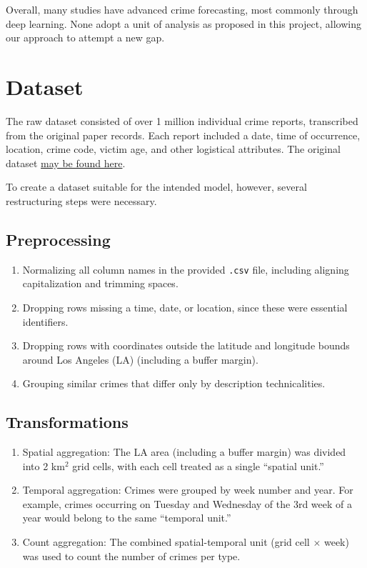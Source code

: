 \documentclass[11pt]{article}
\begin{document}
Overall, many studies have advanced crime forecasting, most commonly through deep learning. None adopt a unit of analysis as proposed in this project, allowing our approach to attempt a new gap.

\section{Dataset}

The raw dataset consisted of over 1 million individual crime reports, transcribed from the original paper records. Each report included a date, time of occurrence, location, crime code, victim age, and other logistical attributes. The original dataset \href{https://www.kaggle.com/datasets/cityofLA/crime-in-los-angeles}{may be found here}.

To create a dataset suitable for the intended model, however, several restructuring steps were necessary.

\subsection{Preprocessing}
\begin{enumerate}
    \item Normalizing all column names in the provided \texttt{.csv} file, including aligning capitalization and trimming spaces.
    \item Dropping rows missing a time, date, or location, since these were essential identifiers.
    \item Dropping rows with coordinates outside the latitude and longitude bounds around Los Angeles (LA) (including a buffer margin).
    \item Grouping similar crimes that differ only by description technicalities.
\end{enumerate}

\subsection{Transformations}
\begin{enumerate}
    \item Spatial aggregation: The LA area (including a buffer margin) was divided into 2 km$^2$ grid cells, with each cell treated as a single ``spatial unit.''
    \item Temporal aggregation: Crimes were grouped by week number and year. For example, crimes occurring on Tuesday and Wednesday of the 3rd week of a year would belong to the same ``temporal unit.''
    \item Count aggregation: The combined spatial-temporal unit (grid cell $\times$ week) was used to count the number of crimes per type.
\end{enumerate}
\end{document}
